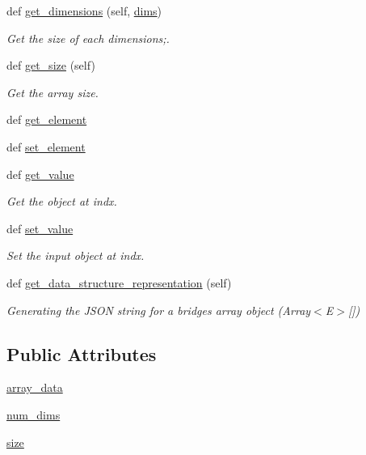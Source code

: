 \begin{DoxyCompactItemize}
def \hyperlink{classbridges_1_1array_1_1_array_a25d42635a6bd5e8a5a6de6973b5a33a7}{get\+\_\+dimensions} (self, \hyperlink{classbridges_1_1array_1_1_array_a69f2c673a6077e203b3e916dd73cd243}{dims})
\begin{DoxyCompactList}\small\item\em Get the size of each dimensions;. \end{DoxyCompactList}\item 
def \hyperlink{classbridges_1_1array_1_1_array_a809b5997e247653ad8661661dcbeffc3}{get\+\_\+size} (self)
\begin{DoxyCompactList}\small\item\em Get the array size. \end{DoxyCompactList}\item 
def \hyperlink{classbridges_1_1array_1_1_array_ab108d160a7dd6e3adf44f75232c7de40}{get\+\_\+element}
\item 
def \hyperlink{classbridges_1_1array_1_1_array_a0f59e21fa05309c01f1cac5ec68b5340}{set\+\_\+element}
\item 
def \hyperlink{classbridges_1_1array_1_1_array_a78a649a22126c236770099a45b52f8d1}{get\+\_\+value}
\begin{DoxyCompactList}\small\item\em Get the object at \textquotesingle{}indx\textquotesingle{}. \end{DoxyCompactList}\item 
def \hyperlink{classbridges_1_1array_1_1_array_a449ad62cef572e263ef126dcfb8b0061}{set\+\_\+value}
\begin{DoxyCompactList}\small\item\em Set the input object at \textquotesingle{}indx\textquotesingle{}. \end{DoxyCompactList}\item 
def \hyperlink{classbridges_1_1array_1_1_array_a7c6af86feb0ec470afe56505d9ce0cc8}{get\+\_\+data\+\_\+structure\+\_\+representation} (self)
\begin{DoxyCompactList}\small\item\em Generating the J\+S\+O\+N string for a bridges array object (Array$<$\+E$>$\mbox{[}\mbox{]}) \end{DoxyCompactList}\end{DoxyCompactItemize}
\subsection*{Public Attributes}
\begin{DoxyCompactItemize}
\item 
\hyperlink{classbridges_1_1array_1_1_array_a980c0fdfeddadd4c23f06b57015c3c34}{array\+\_\+data}
\item 
\hyperlink{classbridges_1_1array_1_1_array_a2c28c3658312289dc2ae78f4099d4c76}{num\+\_\+dims}
\item 
\hyperlink{classbridges_1_1array_1_1_array_aeac1b1639d0284500f354d41b40c38f7}{size}
\end{DoxyCompactItemize}
